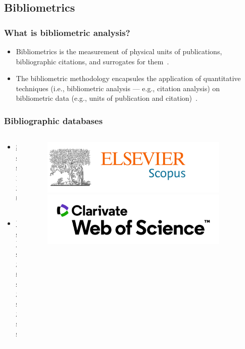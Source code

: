 \documentclass[aspectratio=169]{beamer}
\begin{document}
\subsection{Bibliometrics}


\begin{frame}
	\frametitle{What is bibliometric analysis?}
	\begin{itemize}
		\item Bibliometrics is the measurement of physical units of 
            publications, bibliographic citations, and surrogates for 
            them~\cite{broadus1987}.
		\item The bibliometric methodology encapsules the application of
		      quantitative techniques (i.e., bibliometric analysis --- e.g.,
              citation analysis) on bibliometric data (e.g., units of 
              publication and citation)~\cite{donthu2021}.
	\end{itemize}
\end{frame}

\begin{frame}
	\frametitle{Bibliographic databases}
	\begin{columns}
		\begin{column}{0.5\textwidth}
			\begin{itemize}
				\item \href{https://www.scopus.com}{Scopus}.
				\item \href{https://www.webofknowledge.com}{Web of science}.
			\end{itemize}
		\end{column}
		\begin{column}{0.5\textwidth}
			\begin{figure}
				\centering
				\includegraphics[width=0.9\textwidth]{logos/scopus.png}\newline
				\includegraphics[width=0.9\textwidth]{logos/wos.png}
			\end{figure}
		\end{column}
	\end{columns}
\end{frame}
\end{document}
